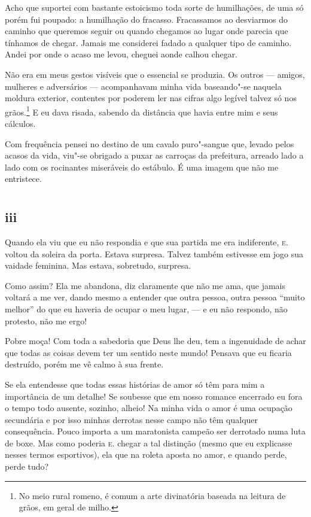 \noindent{}Acho que suportei com bastante estoicismo toda sorte de humilhações, de
uma só porém fui poupado: a humilhação do fracasso. Fracassamos ao
desviarmos do caminho que queremos seguir ou quando chegamos ao lugar
onde parecia que tínhamos de chegar. Jamais me considerei
fadado a qualquer tipo de caminho. Andei por onde o acaso me levou,
cheguei aonde calhou chegar.

Não era em meus gestos visíveis que o essencial se produzia. Os outros ---
amigos, mulheres e adversários --- acompanhavam minha vida baseando"-se
naquela moldura exterior, contentes por poderem ler nas cifras algo
legível talvez só nos grãos.\footnote{No meio
rural romeno, é comum a arte divinatória baseada na leitura de grãos, em
geral de milho.} E eu dava risada, sabendo da distância
que havia entre mim e seus cálculos.

Com frequência pensei no destino de um cavalo puro"-sangue que,
levado pelos acasos da vida, viu"-se obrigado a puxar as carroças da
prefeitura, arreado lado a lado com os rocinantes miseráveis do
estábulo. É uma imagem que não me entristece.



\chapter*{}
\section{iii}



\noindent{}Quando ela viu que eu não respondia e que sua partida me era
indiferente, \textsc{e.} voltou da soleira da porta. Estava surpresa. Talvez
também estivesse em jogo sua vaidade feminina. Mas estava, sobretudo, surpresa.

Como assim? Ela me abandona, diz claramente que não me ama, que jamais
voltará a me ver, dando mesmo a entender que outra pessoa, outra pessoa
``muito melhor'' do que eu haveria de ocupar o meu lugar, --- e eu não
respondo, não protesto, não me ergo!

Pobre moça! Com toda a sabedoria que Deus lhe deu, tem a
ingenuidade de achar que todas as coisas devem ter um sentido
neste mundo! Pensava que eu ficaria destruído, porém me vê calmo à sua
frente.

Se ela entendesse que todas essas histórias de amor só têm para mim a
importância de um detalhe! Se soubesse que em nosso romance
encerrado eu fora o tempo todo ausente, sozinho, alheio! Na minha vida
o amor é uma ocupação secundária e por isso minhas derrotas nesse
campo não têm qualquer consequência. Pouco importa a um maratonista
campeão ser derrotado numa luta de boxe. Mas como poderia \textsc{e.} chegar a
tal distinção (mesmo que eu explicasse nesses termos esportivos), ela
que na roleta aposta no amor, e quando perde, perde tudo?

